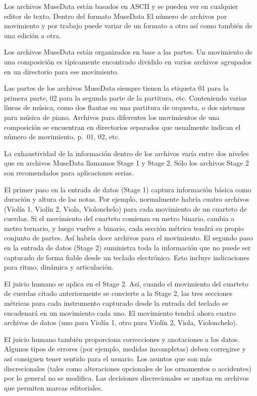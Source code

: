 \documentclass[]{article}
\begin{document}
Los archivos MuseData están basados en ASCII y se pueden ver en
cualquier editor de texto. Dentro del formato MuseData El número de
archivos por movimiento y por trabajo puede variar de un formato a otro
así como también de una edición a otra.

Los archivos MuseData están organizados en base a las partes. Un
movimiento de una composición es típicamente encontrado dividido en
varios archivos agrupados en un directorio para ese movimiento.

Las partes de los archivos MuseData siempre tienen la etiqueta 01 para
la primera parte, 02 para la segunda parte de la partitura, etc.
Conteniendo varias líneas de música, como dos flautas en una partitura
de orquesta, o dos sistemas para música de piano. Archivos para
diferentes los movimientos de una composición se encuentran en
directorios separados que usualmente indican el número de movimiento,
p.~01, 02, etc.

La exhaustividad de la información dentro de los archivos varía entre
dos niveles que en archivos MuseData llamamos Stage 1 y Stage 2. Sólo
los archivos Stage 2 son recomendados para aplicaciones serias.

El primer paso en la entrada de datos (Stage 1) captura información
básica como duración y altura de las notas. Por ejemplo, normalmente
habría cuatro archivos (Violín 1, Violín 2, Viola, Violonchelo) para
cada movimiento de un cuarteto de cuerdas. Si el movimiento del cuarteto
comienza en metro binario, cambia a metro ternario, y luego vuelve a
binario, cada sección métrica tendrá su propio conjunto de partes. Así
habría doce archivos para el movimiento. El segundo paso en la entrada
de datos (Stage 2) suministra toda la información que no puede ser
capturado de forma fiable desde un teclado electrónico. Esto incluye
indicaciones para ritmo, dinámica y articulación.

El juicio humano se aplica en el Stage 2. Así, cuando el movimiento del
cuarteto de cuerdas citado anteriormente se convierte a la Stage 2, las
tres secciones métricas para cada instrumento capturado desde la entrada
del teclado se encadenará en un movimiento cada uno. El movimiento
tendrá ahora cuatro archivos de datos (uno para Violín 1, otro para
Violín 2, Viola, Violonchelo).

El juicio humano también proporciona correcciones y anotaciones a los
datos. Algunos tipos de errores (por ejemplo, medidas incompletas) deben
corregirse y así consiguen tener sentido para el usuario. Los asuntos
que son más discrecionales (tales como alteraciones opcionales de los
ornamentos o accidentes) por lo general no se modifica. Las decisiones
discrecionales se anotan en archivos que permiten marcas editoriales.
\end{document}
